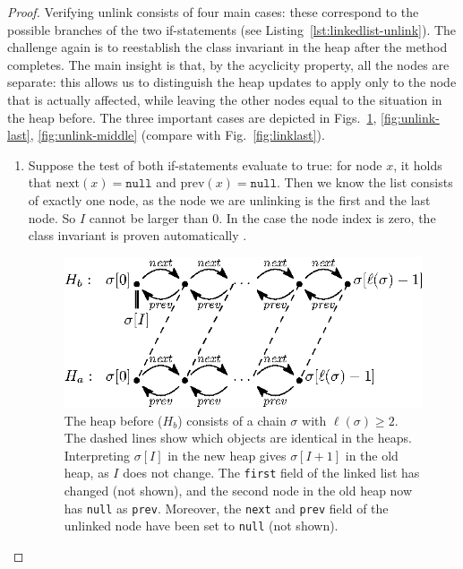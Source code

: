 \documentclass[runningheads]{llncs}
\theoremstyle{remark}
\begin{document}
\begin{proof}
Verifying unlink consists of four main cases: these correspond to the possible branches of the two if-statements (see Listing~\ref{lst:linkedlist-unlink}). The challenge again is to reestablish the class invariant in the heap after the method completes. The main insight is that, by the acyclicity property, all the nodes are separate: this allows us to distinguish the heap updates to apply only to the node that is actually affected, while leaving the other nodes equal to the situation in the heap before. The three important cases are depicted in Figs.~\ref{fig:unlink-first}, \ref{fig:unlink-last}, \ref{fig:unlink-middle} (compare with Fig.~\ref{fig:linklast}).

\begin{enumerate}
    \item Suppose the test of both if-statements evaluate to true: for node $x$, it holds that $\mathrm{next}(x)=\mathtt{null}$ and $\mathrm{prev}(x)=\mathtt{null}$. Then we know the list consists of exactly one node, as the node we are unlinking is the first and the last node. So $I$ cannot be larger than 0. In the case the node index is zero, the class invariant is proven automatically .
    
\begin{figure}
   \centering
   \includegraphics[scale=1]{figures/linkedlist-unlink-first.eps}
   \caption{The heap before ($H_b$) consists of a chain $\sigma$ with $\ell(\sigma)\geq 2$. The dashed lines show which objects are identical in the heaps.  Interpreting $\sigma[I]$ in the new heap gives $\sigma[I+1]$ in the old heap, as $I$ does not change. The \texttt{first} field of the linked list has changed (not shown), and the second node in the old heap now has \texttt{null} as \texttt{prev}. Moreover, the \texttt{next} and \texttt{prev} field of the unlinked node have been set to \texttt{null} (not shown).}
   \vspace*{-12pt}
   \label{fig:unlink-first}
\end{figure}
    

\end{enumerate}
\end{proof}
\end{document}
